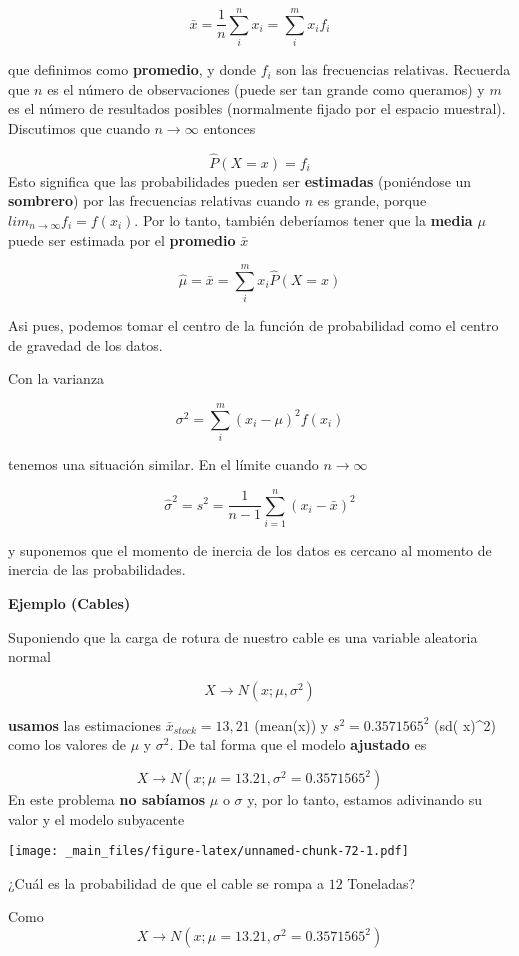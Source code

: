 \documentclass[
]{book}
\begin{document}
\[\bar{x}= \frac{1}{n} \sum_{i}^n x_i = \sum_{i}^m x_if_i\]

que definimos como \textbf{promedio}, y donde \(f_i\) son las frecuencias relativas. Recuerda que \(n\) es el número de observaciones (puede ser tan grande como queramos) y \(m\) es el número de resultados posibles (normalmente fijado por el espacio muestral). Discutimos que cuando \(n \rightarrow \infty\) entonces

\[\hat{P}(X=x)=f_i\]
Esto significa que las probabilidades pueden ser \textbf{estimadas} (poniéndose un \textbf{sombrero}) por las frecuencias relativas cuando \(n\) es grande, porque \(lim_{n\rightarrow \infty}f_i=f(x_i)\). Por lo tanto, también deberíamos tener que la \textbf{media} \(\mu\) puede ser estimada por el \textbf{promedio} \(\bar{x}\)

\[\hat{\mu}=\bar{x}= \sum_{i}^m x_i\hat{P}(X=x)\]

Asi pues, podemos tomar el centro de la función de probabilidad como el centro de gravedad de los datos.

Con la varianza

\[\sigma^2=\sum_{i}^m (x_i-\mu)^2f(x_i)\]

tenemos una situación similar. En el límite cuando \(n \rightarrow \infty\)

\[\hat{\sigma}^2=s^2=\frac{1}{n-1}\sum_{i=1}^n (x_i-\bar{x})^2\]

y suponemos que el momento de inercia de los datos es cercano al momento de inercia de las probabilidades.

\textbf{Ejemplo (Cables)}

Suponiendo que la carga de rotura de nuestro cable es una variable aleatoria normal

\[X \rightarrow N(x; \mu, \sigma^2)\]

\textbf{usamos} las estimaciones \(\bar{x}_{stock}=13,21\) (mean(x)) y \(s^2=0.3571565^2\) (sd( x)\^{}2) como los valores de \(\mu\) y \(\sigma^2\). De tal forma que el modelo \textbf{ajustado} es

\[X \rightarrow N(x; \mu=13.21, \sigma^2=0.3571565^2)\]
En este problema \textbf{no sabíamos} \(\mu\) o \(\sigma\) y, por lo tanto, estamos adivinando su valor y el modelo subyacente

\texttt{[image: \_main\_files/figure-latex/unnamed-chunk-72-1.pdf]}

¿Cuál es la probabilidad de que el cable se rompa a \(12\) Toneladas?

Como \[X \rightarrow N(x; \mu=13.21, \sigma^2=0.3571565^2)\]
\end{document}
